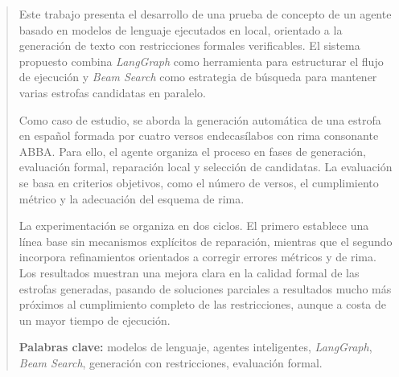\documentclass[12pt,a4paper,twoside,openright]{book}
\begin{document}
\renewcommand{\abstractname}{Resumen}
\begin{abstract}
\setlength{\parindent}{0pt}
\setlength{\parskip}{0.6em}

Este trabajo presenta el desarrollo de una prueba de concepto de un agente basado en modelos de lenguaje ejecutados en local, orientado a la generación de texto con restricciones formales verificables.
El sistema propuesto combina \emph{LangGraph} como herramienta para estructurar el flujo de ejecución y \emph{Beam Search} como estrategia de búsqueda para mantener varias estrofas candidatas en paralelo.

Como caso de estudio, se aborda la generación automática de una estrofa en español formada por cuatro versos endecasílabos con rima consonante ABBA.
Para ello, el agente organiza el proceso en fases de generación, evaluación formal, reparación local y selección de candidatas. La evaluación se basa en criterios objetivos, como el número de versos, el cumplimiento métrico y la adecuación del esquema de rima.

La experimentación se organiza en dos ciclos. El primero establece una línea base sin mecanismos explícitos de reparación, mientras que el segundo incorpora refinamientos orientados a corregir errores métricos y de rima.
Los resultados muestran una mejora clara en la calidad formal de las estrofas generadas, pasando de soluciones parciales a resultados mucho más próximos al cumplimiento completo de las restricciones, aunque a costa de un mayor tiempo de ejecución.

\medskip

\noindent \textbf{Palabras clave:} modelos de lenguaje, agentes inteligentes, \emph{LangGraph}, \emph{Beam Search}, generación con restricciones, evaluación formal.
\end{abstract}
\end{document}
